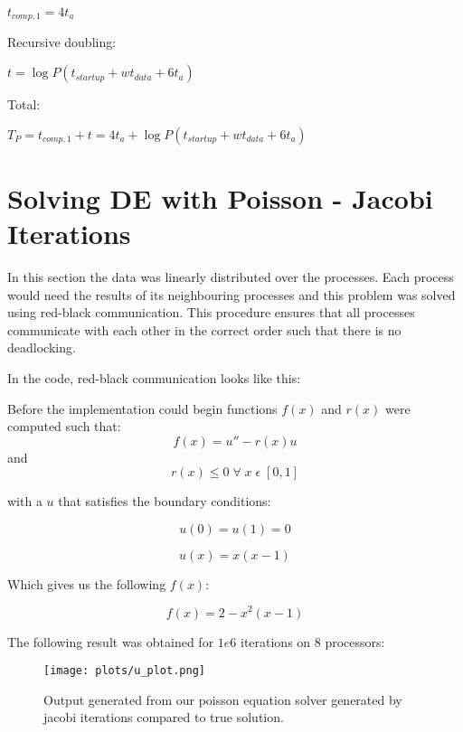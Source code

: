 \documentclass[a4paper]{exam}
\begin{document}
\begin{questions}
$t_{comp,1} = 4t_a$

Recursive doubling:

$t = \log P(t_{startup} + wt_{data} + 6t_a)$

Total:

$T_P = t_{comp,1} + t = 4t_a +\log P(t_{startup} + wt_{data} + 6t_a) $

\section{Solving DE with Poisson - Jacobi Iterations}

In this section the data was linearly distributed over the processes. Each process would need the results of its neighbouring processes and this problem was solved using red-black communication. This procedure ensures that all processes communicate with each other in the correct order such that there is no deadlocking.

In the code, red-black communication looks like this:



Before the implementation could begin functions $f(x)$ and $r(x)$ were computed such that:
\begin{equation}
  f(x) = u'' - r(x)u
\end{equation}
and
\begin{equation}
  r(x) \leq 0 \; \forall \; x \; \epsilon \; [0,1]
\end{equation}

with a $u$ that satisfies the boundary conditions:

\begin{equation}
  u(0) = u(1) = 0
\end{equation}

\begin{equation*}
  u(x) = x(x-1)
\end{equation*}

Which gives us the following $f(x)$:

\begin{equation}
  f(x) = 2 - x^2(x-1)
\end{equation}

The following result was obtained for $1e6$ iterations on 8 processors:

\begin{figure}
  \center
  \texttt{[image: plots/u\_plot.png]}
  \caption{Output generated from our poisson equation solver generated by jacobi iterations compared to true solution.}
  \label{plot}
\end{figure}


\end{questions}
\end{document}
